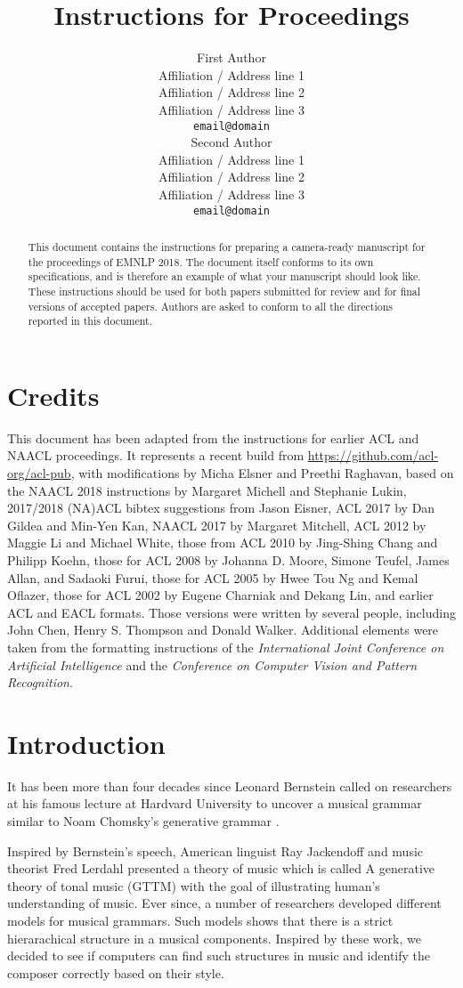 \documentclass[11pt,a4paper]{article}
\title{Instructions for \confname{} Proceedings}
\author{First Author \\
  Affiliation / Address line 1 \\
  Affiliation / Address line 2 \\
  Affiliation / Address line 3 \\
  {\tt email@domain} \\\And
  Second Author \\
  Affiliation / Address line 1 \\
  Affiliation / Address line 2 \\
  Affiliation / Address line 3 \\
  {\tt email@domain} \\}
\date{}
\newcommand\confname{EMNLP 2018}
\begin{document}
\maketitle
\begin{abstract}
  This document contains the instructions for preparing a camera-ready
  manuscript for the proceedings of \confname{}. The document itself
  conforms to its own specifications, and is therefore an example of
  what your manuscript should look like. These instructions should be
  used for both papers submitted for review and for final versions of
  accepted papers.  Authors are asked to conform to all the directions
  reported in this document.
\end{abstract}

\section{Credits}

This document has been adapted from the instructions for earlier ACL
and NAACL proceedings. It represents a recent build from
\url{https://github.com/acl-org/acl-pub}, with modifications by Micha
Elsner and Preethi Raghavan, based on the NAACL 2018 instructions by
Margaret Michell and Stephanie Lukin, 2017/2018 (NA)ACL bibtex
suggestions from Jason Eisner, ACL 2017 by Dan Gildea and Min-Yen Kan,
NAACL 2017 by Margaret Mitchell, ACL 2012 by Maggie Li and Michael
White, those from ACL 2010 by Jing-Shing Chang and Philipp Koehn,
those for ACL 2008 by Johanna D. Moore, Simone Teufel, James Allan,
and Sadaoki Furui, those for ACL 2005 by Hwee Tou Ng and Kemal
Oflazer, those for ACL 2002 by Eugene Charniak and Dekang Lin, and
earlier ACL and EACL formats.  Those versions were written by several
people, including John Chen, Henry S. Thompson and Donald
Walker. Additional elements were taken from the formatting
instructions of the {\em International Joint Conference on Artificial
  Intelligence} and the \emph{Conference on Computer Vision and
  Pattern Recognition}.

\section{Introduction}
It has been more than four decades since Leonard Bernstein called on researchers at his famous lecture at Hardvard University \cite{Bernstein} to uncover a musical grammar similar to Noam Chomsky's generative grammar \cite{Chomsky}.

Inspired by Bernstein's speech, American linguist Ray Jackendoff and music theorist Fred Lerdahl presented a theory of music which is called A generative theory of tonal music (GTTM) with the goal of illustrating human's understanding of music. Ever since, a number of researchers developed different models for musical grammars. Such models shows that there is a strict hierarachical structure in a musical components. Inspired by these work, we decided to see if computers can find such structures in music and identify the composer correctly based on their style. 
\end{document}

